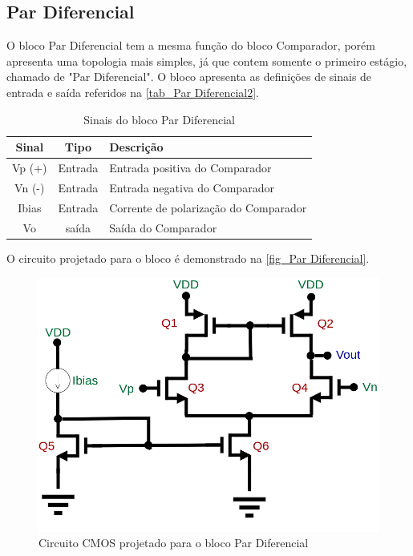 \renewcommand{\NomeBloco}{Par Diferencial}
\renewcommand{\NomePTab}{tab_\NomeBloco}
\renewcommand{\NomeSTab}{tab_\NomeBloco2}
\renewcommand{\NomePFig}{fig_\NomeBloco}
\renewcommand{\NomeSFig}{fig_\NomeBloco2}
\renewcommand{\NomeTTab}{tab_\NomeBloco3}
\renewcommand{\NomeQTab}{tab_\NomeBloco4}

\subsection{\NomeBloco}

O bloco \NomeBloco{} tem a mesma fun{\c c}\~ao do bloco Comparador, por\'em apresenta uma topologia mais simples, j\'a que contem somente o primeiro est\'agio, chamado de "Par Diferencial". O bloco apresenta as defini{\c c}\~oes de sinais de entrada e sa\'ida referidos na \autoref{\NomeSTab}.

\begin{table}[htbp]
\caption{Sinais do bloco \NomeBloco}
\label{\NomeSTab}
\centering
\begin{tabular}{ccl}

    \toprule
    Sinal & Tipo    & Descri{\c c}\~ao        \\
    \midrule \midrule
    Vp (+) & Entrada & Entrada positiva do Comparador\\
    \midrule
    Vn (-) & Entrada & Entrada negativa do Comparador\\
    \midrule
    Ibias & Entrada & Corrente de polariza{\c c}\~ao do Comparador\\
    \midrule
    Vo & sa\'ida & Sa\'ida do Comparador\\
    \bottomrule
\end{tabular}
\end{table}

O circuito projetado para o bloco \'e demonstrado na \autoref{\NomePFig}.

\begin{figure}[htb]
 \label{\NomePFig}
 \centering
    \centering
    \caption{Circuito CMOS projetado para o bloco \NomeBloco} 
    \includegraphics[scale=0.4]{Circuitos/diff_pair.png}
\end{figure}

